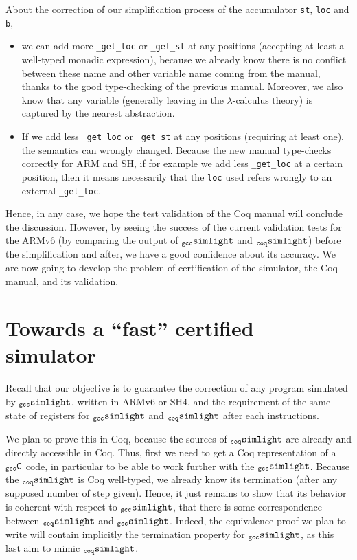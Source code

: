 \documentclass[a4paper, 11pt]{article}
\newcommand{\gccSL}{$_{\tt gcc}{\tt simlight}$\xspace}
\newcommand{\SL}{$_{\tt coq}{\tt simlight}$\xspace}
\newcommand{\gccC}{$_{\tt gcc}{\tt C}$\xspace}
\begin{document}
About the correction of our simplification process of the accumulator \verb|st|, \verb|loc| and \verb|b|, 
\begin{itemize}
\item we can add more \verb|_get_loc| or \verb|_get_st| at any positions (accepting at least a well-typed monadic expression), because we already know there is no conflict between these name and other variable name coming from the manual, thanks to the good type-checking of the previous manual. Moreover, we also know that any variable (generally leaving in the $\lambda$-calculus theory) is captured by the nearest abstraction.
\item If we add less \verb|_get_loc| or \verb|_get_st| at any positions (requiring at least one), the semantics can wrongly changed. Because the new manual type-checks correctly for ARM and SH, if for example we add less \verb|_get_loc| at a certain position, then it means necessarily that the \verb|loc| used refers wrongly to an external \verb|_get_loc|.
\end{itemize}
Hence, in any case, we hope the test validation of the Coq manual will conclude the discussion. However, by seeing the success of the current validation tests for the ARMv6 (by comparing the output of \gccSL and \SL) before the simplification and after, we have a good confidence about its accuracy. We are now going to develop the problem of certification of the simulator, the Coq manual, and its validation.
\section{Towards a ``fast'' certified simulator}
\label{s:fast_certi}

Recall that our objective is to guarantee the correction of any program simulated by \gccSL, written in ARMv6 or SH4, and the requirement of the same state of registers for \gccSL and \SL after each instructions. 

We plan to prove this in Coq, because the sources of \SL are already and directly accessible in Coq. Thus, first we need to get a Coq representation of a \gccC code, in particular to be able to work further with the \gccSL. 
Because the \SL is Coq well-typed, we already know its termination (after any supposed number of step given). Hence, it just remains to show that its behavior is coherent with respect to \gccSL, that there is some correspondence between \SL and \gccSL. Indeed, the equivalence proof we plan to write will contain implicitly the termination property for \gccSL, as this last aim to mimic \SL. 
\end{document}
